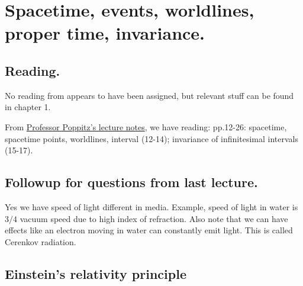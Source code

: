 %
%

\chapter{Spacetime, events, worldlines, proper time, invariance.}
\label{chap:relativisticElectrodynamicsL2}
{}
\date{Jan 12, 2011}

\beginArtNoToc

\section{Reading.}

No reading from \cite{landau1980classical} appears to have been assigned, but relevant stuff can be found in chapter 1.

From \href{http://www.physics.utoronto.ca/~poppitz/epoppitz/PHY450_files/RelEM12-26.pdf}{Professor Poppitz's lecture notes}, we have reading: pp.12-26: spacetime, spacetime points, worldlines, interval (12-14); invariance of infinitesimal intervals (15-17).

\section{Followup for questions from last lecture.}

Yes we have speed of light different in media.  Example, speed of light in water is $3/4$ vacuum speed due to high index of refraction.  Also note that we can have effects like an electron moving in water can constantly emit light.  This is called Cerenkov radiation.

\section{Einstein's relativity principle}

